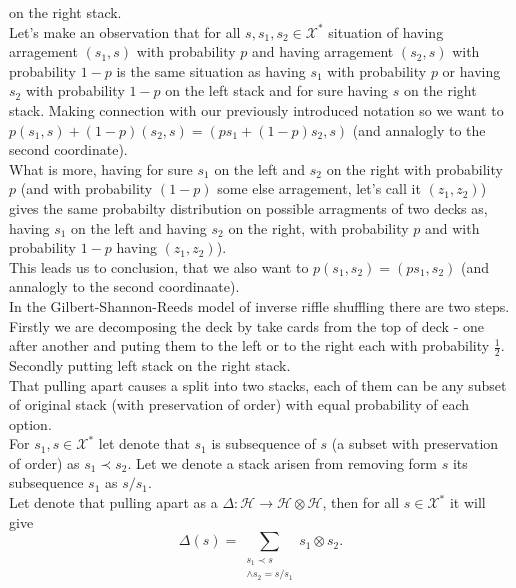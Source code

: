 \documentclass[a4paper, 12pt]{report}
\begin{document}
on the right stack. \\ 
Let's make an observation that for all $s, s_1, s_2 \in \mathcal{X}^*$ situation of having arragement 
$(s_1, s)$ with probability $p$ and having arragement $(s_2, s)$ with probability $1-p$ is 
the same situation as having $s_1$ with probability $p$ or having $s_2$ with probability $1 - p$ on the left 
stack and for sure having $s$ on the right stack. Making connection with our previously introduced notation 
so we want to $p(s_1, s) + (1-p)(s_2, s) = (ps_1 + (1-p)s_2, s)$ (and annalogly to the second coordinate).\\
What is more, having for sure $s_1$ on the left and $s_2$ on the right with probability $p$ (and 
with probability $(1 - p)$ some else arragement, let's call it $(z_1, z_2)$) gives the same probabilty 
distribution 
on possible arragments of two decks as, having $s_1$ on the left and having $s_2$ on the 
right, with probability $p$ and with probability $1-p$ having $(z_1,z_2)$).\\
This leads us to conclusion, that we also want to $p(s_1,s_2) = (ps_1, s_2)$ (and annalogly to the second 
coordinaate). \\
In the Gilbert-Shannon-Reeds model of inverse riffle shuffling there are two steps. Firstly we are 
decomposing the deck by take cards from the top of deck - one after another and puting them to the left 
or to the right each with probability $\frac{1}{2}$. Secondly putting left stack on the right stack. \\
That pulling apart causes a split into two stacks, each of them can be any subset of original stack 
(with preservation of order) with equal probability of each option. \\
For $s_1, s \in \mathcal{X}^*$ let denote that $s_1$ is subsequence of $s$ (a subset with preservation of 
order) as $s_1 \prec s_2$. Let we denote a stack arisen from removing form $s$ its subsequence $s_1$ as 
$s/s_1$. \\
Let denote that pulling apart as a $\Delta : \mathcal{H} \to \mathcal{H} \otimes \mathcal{H}$, then for all 
$s \in \mathcal{X}^*$ it will give
\begin{equation*}
\Delta(s) = \sum_{\substack{s_1 \prec s \\ \land s_2 = s/s_1}}
s_1 \otimes s_2.
\end{equation*}
\end{document}
